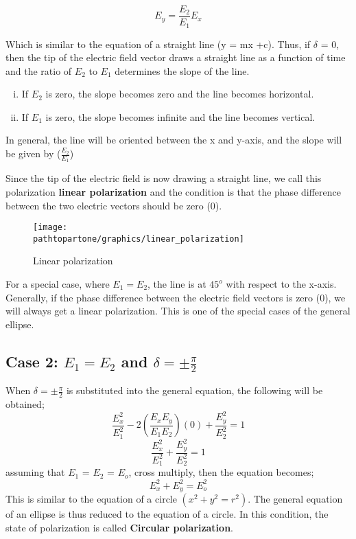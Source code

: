 \begin{equation}
E_y = \frac{E_2}{E_1}E_x
\end{equation}

Which is similar to the equation of a straight line (y = mx +c). Thus, if $\delta$ = 0, then the tip of the electric field vector draws a straight line as a function of time and the ratio of $ E_2 $ to $ E_1 $ determines the slope of the line.
\begin{enumerate}[(i)]
\item If $ E_2 $ is zero, the slope becomes zero and the line becomes horizontal.
\item If $ E_1 $ is zero, the slope becomes infinite and the line becomes vertical.
\end{enumerate} 
In general, the line will be oriented between the x and y-axis, and the slope will be given by ($\frac{E_2}{E_1}$)

Since the tip of the electric field is now drawing a straight line, we call this polarization \textbf {linear polarization} and the condition is that the phase difference between the two electric vectors should be zero (0).
\begin{figure}[h]
\centering
\texttt{[image: \\pathtopartone/graphics/linear\_polarization]}
\caption{Linear polarization}
\end{figure}

For a special case, where $  E_1=E_2 $, the line is at $ 45^{o}$ with respect to the x-axis. Generally, if the phase difference between the electric field vectors is zero (0), we will always get a linear polarization. This is one of the special cases of the general ellipse.

\subsection{Case 2: $ E_1 = E_2 $ and $\delta = \pm \frac{\pi}{2}$}
When $\delta = \pm \frac{\pi}{2}$ is substituted into the general equation, the following will be obtained;
\begin{equation}
\frac{E_{x}^2}{E_{1}^2} -2(\frac{E_{x}E_{y}}{E_{1}E_{2}})(0) + \frac{E_{y}^2}{E_{2}^2} = 1
\end{equation}
\begin{equation}
\frac{E_{x}^2}{E_{1}^2} + \frac{E_{y}^2}{E_{2}^2} = 1
\end{equation}
assuming that $ E_1 $ = $ E_2 $ = $ E_{o} $, cross multiply, then the equation becomes;
\begin{equation}
{E_{x}^2} + {E_{y}^2} = {E_{o}^2}
\end{equation}
This is similar to the equation of a circle $(x^2 + y^2 = r^2)$. The general equation of an ellipse is thus reduced to the equation of a circle. In this condition, the state of polarization is called \textbf{Circular polarization}.

